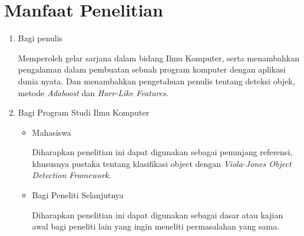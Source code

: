 \section{Manfaat Penelitian}
\begin{enumerate}
	\item Bagi penulis
		
	Memperoleh gelar sarjana dalam bidang Ilmu Komputer, serta menambahkan 
	pengalaman dalam pembuatan sebuah program komputer dengan aplikasi dunia 
	nyata. Dan menambahkan pengetahuan penulis tentang deteksi objek, metode 
	\textit{Adaboost} dan \textit{Harr-Like Features}.
		
	\item Bagi Program Studi Ilmu Komputer
	
	\begin{itemize}
		\item Mahasiswa
		
		Diharapkan penelitian ini dapat digunakan sebagai penunjang referensi, 
		khususnya pustaka tentang klasifikasi object dengan 
		\textit{Viola-Jones Object Detection Framework}.

		\item Bagi Peneliti Selanjutnya
		
		Diharapkan penelitian ini dapat digunakan sebagai dasar atau kajian 
		awal bagi peneliti lain yang ingin meneliti permasalahan yang sama.

	\end{itemize}
			
\end{enumerate}

\begin{comment}

\end{comment}
